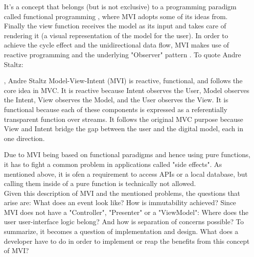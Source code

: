\cite{immutabilityEffectiveJavaJoshuaBloch2017,immutabilityImmutableObjectsInJavaChristianHaack2006}
It's a concept that belongs (but is not exclusive) to a programming paradigm called functional programming
\cite{functionalProgrammingFunctionalProgrammingInJavaPierreYves2017},
where MVI adopts some of its ideas from.
\\
Finally the view function receives the model as its input and takes care of rendering it (a visual representation of the model for the user). 
In order to achieve the cycle effect and the unidirectional data flow, MVI makes use of reactive programming 
\cite{reactiveProgrammingReactiveProgrammingWithJavaBenChristensen,reactiveProgrammingTheIntroductionToReactiveAndreStaltz} 
and the underlying "Observer" pattern 
\cite{}.
To quote Andre Staltz:
\begin{pquotation}{\cite{citationMVIAndreStaltz}, Andre Staltz}
    Model-View-Intent (MVI) is reactive, functional, and follows the core idea in MVC. It is reactive because Intent observes the User, Model observes the Intent, 
    View observes the Model, and the User observes the View. It is functional because each of these components is expressed as a referentially transparent function 
    over streams. It follows the original MVC purpose because View and Intent bridge the gap between the user and the digital model, each in one direction.
\end{pquotation}
Due to MVI being based on functional paradigms and hence using pure functions, it has to fight a common problem in applications called "side effects".
As mentioned above, it is ofen a requirement to access APIs or a local database, but calling them inside of a pure function is technically not allowed.
\\
Given this description of MVI and the mentioned problems, the questions that arise are: What does an event look like? How is immutability achieved?
Since MVI does not have a "Controller", "Presenter" or a "ViewModel": Where does the user user-interface logic belong? And how is separation of concerns possible?
To summarize, it becomes a question of implementation and design. What does a developer have to do in order to implement or reap the benefits from this concept of MVI?




